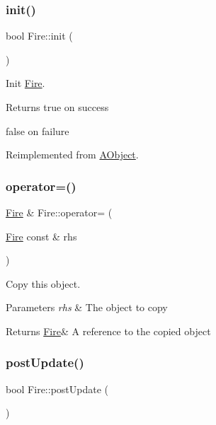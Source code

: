 \subsubsection{\texorpdfstring{init()}{init()}}
{\footnotesize\ttfamily bool Fire\+::init (\begin{DoxyParamCaption}{ }\end{DoxyParamCaption})\hspace{0.3cm}{\ttfamily [virtual]}}



Init \hyperlink{class_fire}{Fire}. 

\begin{DoxyReturn}{Returns}
true on success 

false on failure 
\end{DoxyReturn}


Reimplemented from \hyperlink{class_a_object_afa83ef1c900a47453524219788327b86}{A\+Object}.

\mbox{\label{class_fire_a5e11dd81a73d16b09253b17c89b32322}} 
\subsubsection{\texorpdfstring{operator=()}{operator=()}}
{\footnotesize\ttfamily \hyperlink{class_fire}{Fire} \& Fire\+::operator= (\begin{DoxyParamCaption}\item[{\hyperlink{class_fire}{Fire} const \&}]{rhs }\end{DoxyParamCaption})}



Copy this object. 


\begin{DoxyParams}{Parameters}
{\em rhs} & The object to copy \\
\hline
\end{DoxyParams}
\begin{DoxyReturn}{Returns}
\hyperlink{class_fire}{Fire}\& A reference to the copied object 
\end{DoxyReturn}
\mbox{\label{class_fire_adba3c7ec49ed7d31fd35250105a35edf}} 
\subsubsection{\texorpdfstring{post\+Update()}{postUpdate()}}
{\footnotesize\ttfamily bool Fire\+::post\+Update (\begin{DoxyParamCaption}{ }\end{DoxyParamCaption})\hspace{0.3cm}{\ttfamily [virtual]}}




